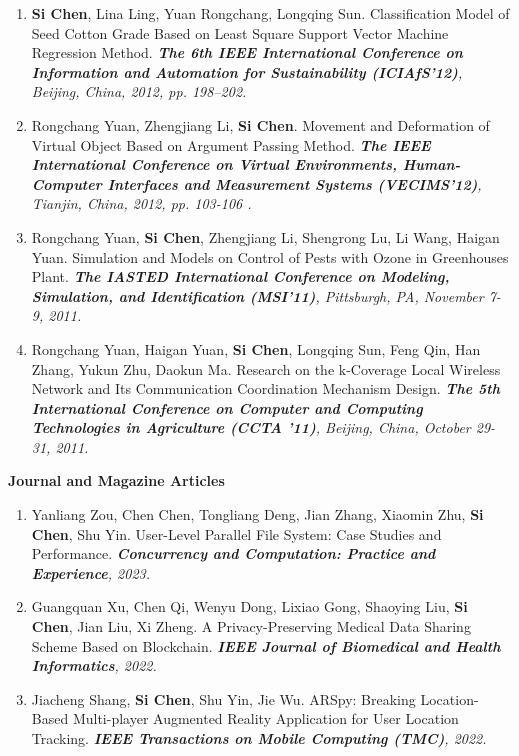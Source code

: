 \documentclass[letter]{article}
\newcommand{\publication}[4]{\item #1. #2. \emph{#3.} #4}
\begin{document}
\begin{description}
\begin{enumerate}[{C-}1.]
\publication{\textbf{Si Chen}, Lina Ling, Yuan Rongchang, Longqing Sun} {Classification Model of Seed Cotton Grade Based on Least Square Support Vector Machine Regression Method}  {\textbf{The 6th IEEE International Conference on Information and Automation for Sustainability (ICIAfS'12)}, Beijing, China, 2012, pp. 198--202} \\

\publication{Rongchang Yuan, Zhengjiang Li, \textbf{Si Chen}} {Movement and Deformation of Virtual Object Based on Argument Passing Method}  {\textbf{The IEEE International Conference on Virtual Environments, Human-Computer Interfaces and Measurement Systems (VECIMS'12)}, Tianjin, China, 2012, pp. 103-106 } \\

\publication{Rongchang Yuan, \textbf{Si Chen}, Zhengjiang Li, Shengrong Lu, Li Wang, Haigan Yuan} {Simulation and Models on Control of Pests with Ozone in Greenhouses Plant}  {\textbf{The IASTED International Conference on Modeling, Simulation, and Identification (MSI'11)}, Pittsburgh, PA, November 7-9, 2011} \\

\publication{Rongchang Yuan, Haigan Yuan, \textbf{Si Chen}, Longqing Sun, Feng Qin, Han Zhang, Yukun Zhu, Daokun Ma} {Research on the k-Coverage Local Wireless Network and Its Communication Coordination Mechanism Design}  {\textbf{The 5th International Conference on Computer and Computing Technologies in Agriculture (CCTA '11)}, Beijing, China, October 29-31, 2011} \\

\end{enumerate}

\textbf{Journal and Magazine Articles}

\begin{enumerate}[{J-}1.]

\publication{Yanliang Zou, Chen Chen, Tongliang Deng, Jian Zhang, Xiaomin Zhu, \textbf{Si Chen}, Shu Yin} {User-Level Parallel File System: Case Studies and Performance}  {\textbf{Concurrency and Computation: Practice and Experience}, 2023}\\

\publication{Guangquan Xu, Chen Qi, Wenyu Dong, Lixiao Gong, Shaoying Liu, \textbf{Si Chen}, Jian Liu, Xi Zheng} {A Privacy-Preserving Medical Data Sharing Scheme Based on Blockchain}  {\textbf{IEEE Journal of Biomedical and Health Informatics}, 2022}\\

\publication{Jiacheng Shang, \textbf{Si Chen}, Shu Yin, Jie Wu} {ARSpy: Breaking Location-Based Multi-player Augmented Reality Application for User Location Tracking}
{\textbf{IEEE Transactions on Mobile Computing (TMC)}, 2022}\\


\end{enumerate}
\end{description}
\end{document}
